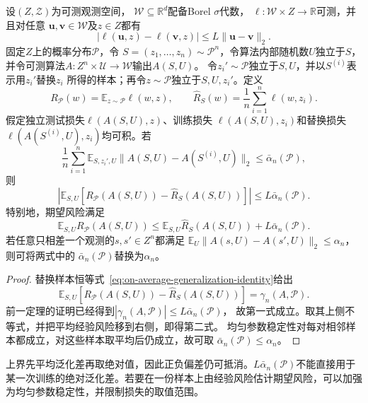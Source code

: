 \begin{theorem}[参数稳定性与期望泛化差]
\label{thm:parameter-expected-generalization}
设$(Z,\mathcal Z)$为可测观测空间，
$\mathcal W\subseteq\mathbb R^d$配备Borel $\sigma$代数，
$\ell:\mathcal W\times Z\to\mathbb R$可测，并且对任意
$\bm u,\bm v\in\mathcal W$及$z\in Z$都有
\[
 |\ell(\bm u,z)-\ell(\bm v,z)|
 \leq L\|\bm u-\bm v\|_2.
\]
固定$Z$上的概率分布$\mathcal P$，令
$S=(z_1,\ldots,z_n)\sim\mathcal P^n$，令算法内部随机数$U$独立于$S$，
并令可测算法$A:Z^n\times\mathcal U\to\mathcal W$输出$A(S,U)$。
令$z_i'\sim\mathcal P$独立于$S,U$，并以$S^{(i)}$表示用$z_i'$替换$z_i$
所得的样本；再令$z\sim\mathcal P$独立于$S,U,z_i'$。定义
\[
 R_{\mathcal P}(w)=\mathbb E_{z\sim\mathcal P}\ell(w,z),
 \qquad
 \hat R_S(w)=\frac1n\sum_{i=1}^n\ell(w,z_i).
\]
假定独立测试损失$\ell(A(S,U),z)$、训练损失
$\ell(A(S,U),z_i)$和替换损失$\ell(A(S^{(i)},U),z_i)$均可积。若
\[
 \frac1n\sum_{i=1}^n\mathbb E_{S,z_i',U}
 \|A(S,U)-A(S^{(i)},U)\|_2
 \leq\bar\alpha_n(\mathcal P),
\]
则
\begin{equation}
 \left|\mathbb E_{S,U}
 [R_{\mathcal P}(A(S,U))-\hat R_S(A(S,U))]\right|
 \leq L\bar\alpha_n(\mathcal P).
 \label{eq:parameter-generalization}
\end{equation}
特别地，期望风险满足
\[
 \mathbb E_{S,U}R_{\mathcal P}(A(S,U))
 \leq\mathbb E_{S,U}\hat R_S(A(S,U))+L\bar\alpha_n(\mathcal P).
\]
若任意只相差一个观测的$s,s'\in Z^n$都满足
$\mathbb E_U\|A(s,U)-A(s',U)\|_2\leq\alpha_n$，则可将两式中的
$\bar\alpha_n(\mathcal P)$替换为$\alpha_n$。
\end{theorem}
\begin{proof}
替换样本恒等式~\eqref{eq:on-average-generalization-identity}给出
\[
 \mathbb E_{S,U}[R_{\mathcal P}(A(S,U))-\hat R_S(A(S,U))]
 =\gamma_n(A,\mathcal P).
\]
前一定理的证明已经得到$|\gamma_n(A,\mathcal P)|\leq L\bar\alpha_n(\mathcal P)$，
故第一式成立。取其上侧不等式，并把平均经验风险移到右侧，即得第二式。
均匀参数稳定性对每对相邻样本都成立，对这些样本取平均后仍成立，故可取
$\bar\alpha_n(\mathcal P)\leq\alpha_n$。
\end{proof}

上界先平均泛化差再取绝对值，因此正负偏差仍可抵消。$L\bar\alpha_n(\mathcal P)$不能直接用于某一次训练的绝对泛化差。若要在一份样本上由经验风险估计期望风险，可以加强为均匀参数稳定性，并限制损失的取值范围。

